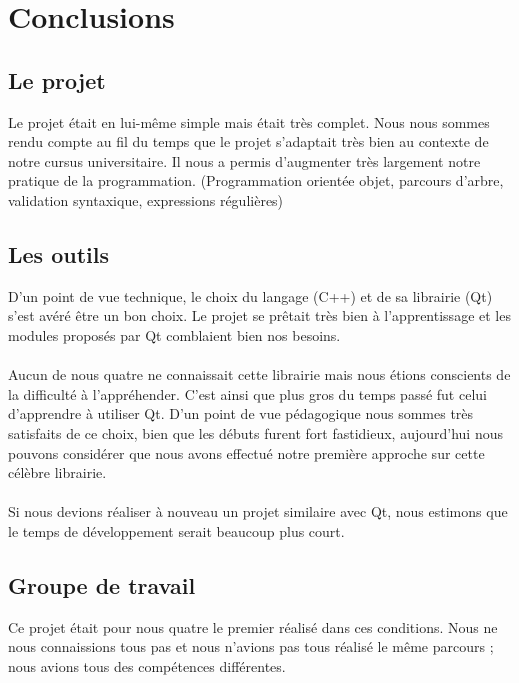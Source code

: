 \section{Conclusions}

\subsection{Le projet}
Le projet était en lui-même simple mais était très complet. Nous nous sommes rendu compte au fil du temps que le projet s'adaptait très bien au contexte de notre cursus universitaire. Il nous a permis d'augmenter très largement notre pratique de la programmation. (Programmation orientée objet, parcours d’arbre, validation syntaxique, expressions régulières)


\subsection{Les outils}
D'un point de vue technique, le choix du langage (C++) et de sa librairie (Qt) s’est avéré être un bon choix. Le projet se prêtait très bien à l’apprentissage et les modules proposés par Qt comblaient bien nos besoins.

\paragraph{}
Aucun de nous quatre ne connaissait cette librairie mais nous étions conscients de la difficulté à l'appréhender. C'est ainsi que plus gros du temps passé fut celui d'apprendre à utiliser Qt. D'un point de vue pédagogique nous sommes très satisfaits de ce choix, bien que les débuts furent fort fastidieux, aujourd'hui nous pouvons considérer que nous avons effectué notre première approche sur cette célèbre librairie.
\paragraph{}
Si nous devions réaliser à nouveau un projet similaire avec Qt, nous estimons que le temps de développement serait beaucoup plus court.

\subsection{Groupe de travail}
Ce projet était pour nous quatre le premier réalisé dans ces conditions. Nous ne nous connaissions tous pas et nous n'avions pas tous réalisé le même parcours ; nous avions tous des compétences différentes.
\paragraph{}

